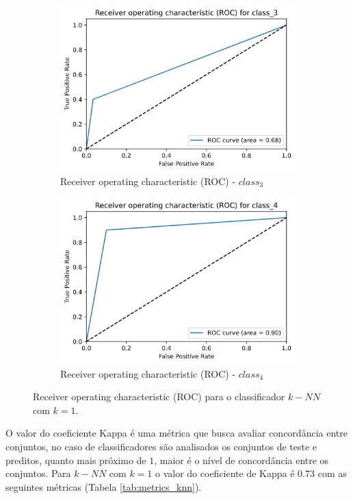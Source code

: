\documentclass[
	article,			%
	11pt,				%
	oneside,			%
	a4paper,			%
	english,			%
	brazil,				%
	sumario=tradicional
	]{abntex2}
\begin{document}
\begin{figure}[h!]
\begin{subfigure}[b]{0.475\textwidth}
    \includegraphics[scale=0.375]{fig/knn_roc3.png}
    \caption{Receiver operating characteristic (ROC) - $class_3$}
    \label{fig:knn_roc3}
    \end{subfigure}
    \hfill
    \begin{subfigure}[b]{0.475\textwidth}
    \centering
    \includegraphics[scale=0.375]{fig/knn_roc4.png}
    \caption{Receiver operating characteristic (ROC) - $class_4$}
    \label{fig:knn_roc4}
    \end{subfigure}
    \caption{Receiver operating characteristic (ROC) para o classificador $k-NN$ com $k=1$.}
    \label{knn_roc}
\end{figure}

O valor do coeficiente Kappa \cite{kappa} é uma métrica que busca avaliar concordância entre conjuntos, no caso de classificadores são analisados os conjuntos de teste e preditos, quanto mais próximo de $1$, maior é o nível de concordância entre os conjuntos. Para $k-NN$ com $k=1$ o valor do coeficiente de Kappa é $0.73$ com as seguintes métricas (Tabela \ref{tab:metrics_knn}).
\end{document}
